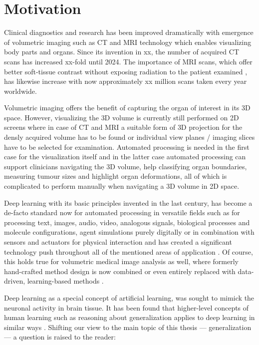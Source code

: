\section{Motivation} %
    Clinical diagnostics and research has been improved dramatically with emergence of volumetric imaging such as \ac{CT} and \ac{MRI} technology which enables visualizing body parts and organs.
    Since its invention in xx, the number of acquired \ac{CT} scans has increased xx-fold until 2024. The importance of \ac{MRI} scans, which offer better soft-tissue contrast without exposing radiation to the patient examined \citep{xx}, has likewise increase with now approximately xx million scans taken every year worldwide. %

    Volumetric imaging offers the benefit of capturing the organ of interest in its \ac{3D} space. However, visualizing the \ac{3D} volume is currently still performed on \ac{2D} screens where in case of \ac{CT} and \ac{MRI} a suitable form of \ac{3D} projection for the densly acquired volume has to be found or individual view planes / imaging slices have to be selected for examination. Automated processing is needed in the first case for the visualization itself and in the latter case automated processing can support clinicians navigating the \ac{3D} volume, help classifying organ boundaries, measuring tumour sizes and highlight organ deformations, all of which is complicated to perform manually when navigating a \ac{3D} volume in \ac{2D} space.

    Deep learning with its basic principles invented in the last century, has become a de-facto standard now for automated processing in versatile fields such as for processing text, images, audio, video, analogous signals, biological processes and molecule configurations, agent simulations purely digitally or in combination with sensors and actuators for physical interaction \citep{xx} and has created a significant technology push throughout all of the mentioned areas of application \citep{xx}.
    Of course, this holds true for volumetric medical image analysis as well, where formerly hand-crafted method design is now combined or even entirely replaced with data-driven, learning-based methods \citep{xx}.

    Deep learning as a special concept of artificial learning, was sought to mimick the neuronal activity in brain tissue. It has been found that higher-level concepts of human learning such as reasoning about generalization applies to deep learning in similar ways \citep{xx}. Shifting our view to the main topic of this thesis --- generalization --- a question is raised to the reader:

